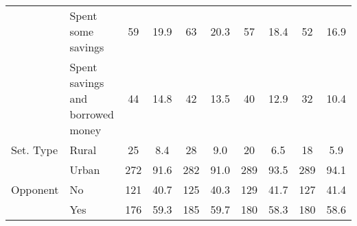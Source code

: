 \begin{table}[!htbp]
{\begin{tabular}[t]{llcccccccc}
 & Spent some savings & 59 & 19.9 & 63 & 20.3 & 57 & 18.4 & 52 & 16.9\\
 & Spent savings and
borrowed money & 44 & 14.8 & 42 & 13.5 & 40 & 12.9 & 32 & 10.4\\
Set. Type & Rural & 25 & 8.4 & 28 & 9.0 & 20 & 6.5 & 18 & 5.9\\
 & Urban & 272 & 91.6 & 282 & 91.0 & 289 & 93.5 & 289 & 94.1\\
Opponent & No & 121 & 40.7 & 125 & 40.3 & 129 & 41.7 & 127 & 41.4\\
 & Yes & 176 & 59.3 & 185 & 59.7 & 180 & 58.3 & 180 & 58.6\\
\bottomrule
\end{tabular}}
\end{table}
